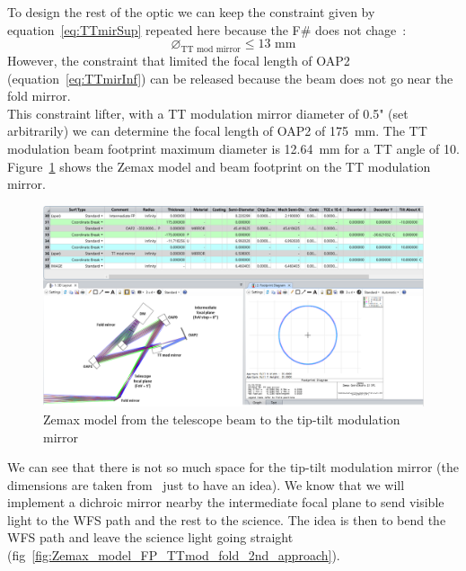 \documentclass[12pt,a4paper]{article}
\begin{document}
To design the rest of the optic we can keep the constraint given by equation~\eqref{eq:TTmirSup} repeated here because the F\# does not chage~:
\begin{equation}
	\diameter_\text{TT mod mirror} \leq 13\text{ mm}\nonumber
\end{equation}
However, the constraint that limited the focal length of OAP2 (equation~\eqref{eq:TTmirInf}) can be released because the beam does not go near the fold mirror.\\
This constraint lifter, with a TT modulation mirror diameter of 0.5" (set arbitrarily) we can determine the focal length of OAP2 of 175~mm. The TT modulation beam footprint maximum diameter is 12.64~mm for a TT angle of 10\degree. Figure~\ref{fig:Zemax_model_FP_TTmod_2nd_approach} shows the Zemax model and beam footprint on the TT modulation mirror.
\begin{figure}[H]
	\begin{center}
		\includegraphics[width=\textwidth]{images/Zemax_model_FP_TTmod_2nd_approach.PNG}
		\caption{Zemax model from the telescope beam to the tip-tilt modulation mirror}\label{fig:Zemax_model_FP_TTmod_2nd_approach}
	\end{center}
\end{figure}
We can see that there is not so much space for the tip-tilt modulation mirror (the dimensions are taken from~\cite{cite:S235PI} just to have an idea). We know that we will implement a dichroic mirror nearby the intermediate focal plane to send visible light to the WFS path and the rest to the science. The idea is then to bend the WFS path and leave the science light going straight (fig~\ref{fig:Zemax_model_FP_TTmod_fold_2nd_approach}).
\end{document}
